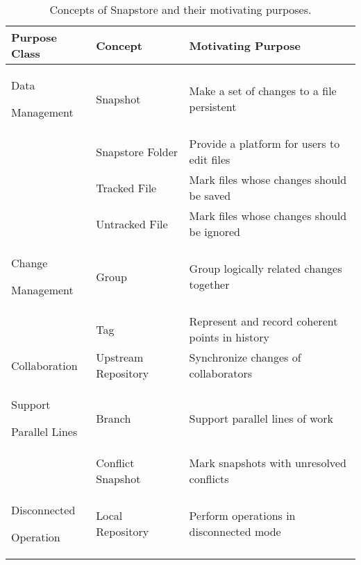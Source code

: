 \begin{table}
\begin{tabular}{ |p{3cm}||p{5cm}||p{7cm}|}
 \hline
 \textbf{Purpose Class} & \textbf{Concept} & \textbf{Motivating Purpose}\\[8pt]
 \hline
 \parbox[t]{3cm}{Data \par Management\strut} & Snapshot & Make a set of changes to a file persistent\\[8pt]
  & Snapstore Folder & Provide a platform for users to edit files\\[8pt]
  & Tracked File & Mark files whose changes should be saved\\[8pt]
  & Untracked File & Mark files whose changes should be ignored\\[8pt]
 \hline
 \parbox[t]{3cm}{Change \par Management\strut} & Group & Group logically related changes together\\[8pt]
  & Tag & Represent and record coherent points in history\\[8pt]
 \hline
 Collaboration & Upstream Repository & Synchronize changes of collaborators\\[8pt]
 \hline
 \parbox[t]{3cm}{Support \par Parallel Lines\strut} & Branch & Support parallel lines of work\\[8pt]
  & Conflict Snapshot & Mark snapshots with unresolved conflicts\\[8pt]
 \hline
 \parbox[t]{3cm}{Disconnected \par Operation\strut} & Local Repository & Perform operations in disconnected mode\\[8pt]
 \hline
\end{tabular}
\caption{Concepts of Snapstore and their motivating purposes.}
\end{table}

